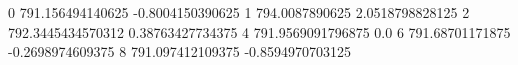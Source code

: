 0 791.156494140625 -0.8004150390625
1 794.0087890625 2.0518798828125
2 792.3445434570312 0.38763427734375
4 791.9569091796875 0.0
6 791.68701171875 -0.2698974609375
8 791.097412109375 -0.8594970703125

